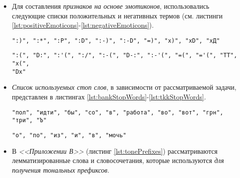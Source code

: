     \begin{itemize}
        \item Для составления {\it признаков на основе эмотиконов}, использовались следующие
        списки положительных и негативных термов (см. листинги
        \ref{lst:positiveEmoticons}-\ref{lst:negativeEmoticons}).

        \begin{lstlisting}[caption="Список положительных эмотиконов", label={lst:positiveEmoticons}]
":)", ":*", ":P", ":D", ":-)", ":-D", "=)", "x)", "xD", "хД"
        \end{lstlisting}
        \begin{lstlisting}[caption="Список негативных эмотиконов", label={lst:negativeEmoticons}]
":(", "D:", ":'(", ":/", ":-(", "D-:", ":-'(", "=(", "='(", "TT", "x(",
"Dx"
        \end{lstlisting}

        \item {\it Список используемых стоп слов}, в зависимости от рассматриваемой задачи,
            представлен в листингах \ref{lst:bankStopWords}-\ref{lst:tkkStopWords}.

        \begin{lstlisting}[caption="Список стоп слов для задачи {\it BANK}", label={lst:bankStopWords}]
"пол", "идти", "бы", "со", "в", "работа", "во", "вот", "грн", "три", "Ъ"
        \end{lstlisting}

        \begin{lstlisting}[caption="Список стоп слов для задачи {\it TKK}", label={lst:tkkStopWords}]
"о", "по", "из", "и", "в", "мочь"
        \end{lstlisting}

        \item В {\it <<Приложении В>>} (листинг \ref{lst:tonePrefixes})
            рассматриваются лемматизированные слова и словосочетания, которые
            используются {\it для получения тональных префиксов}.
    \end{itemize}
